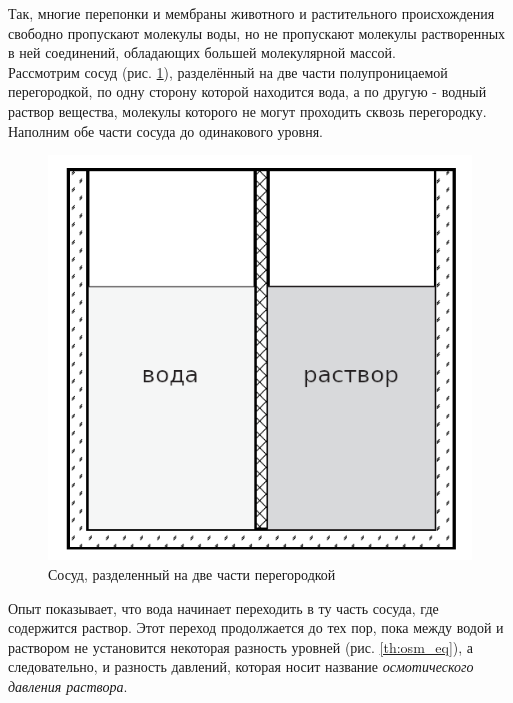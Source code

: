 \documentclass[a4paper, 12pt]{article}
\begin{document}
    \noindent Так, многие перепонки и мембраны животного и растительного происхождения свободно пропускают молекулы воды, но не пропускают молекулы растворенных в ней соединений, обладающих большей молекулярной массой. \\
    
    \noindent Рассмотрим сосуд (рис. \ref{th:osm}), разделённый на две части полупроницаемой перегородкой, по одну сторону которой находится вода, а по другую - водный раствор вещества, молекулы которого не могут проходить сквозь перегородку. Наполним обе части сосуда до одинакового уровня. 

    \begin{figure}[H]
        \centering
        \includegraphics[scale = 0.5]{images/scheme_theory.png}
        \caption{Сосуд, разделенный на две части перегородкой}
        \label{th:osm}
    \end{figure}
    
    \noindent Опыт показывает, что вода начинает переходить в ту часть сосуда, где содержится раствор. Этот переход продолжается до тех пор, пока между водой и раствором не установится некоторая разность уровней (рис. \ref{th:osm_eq}), а следовательно, и разность давлений, которая носит название \textit{осмотического давления раствора}. 
\end{document}
